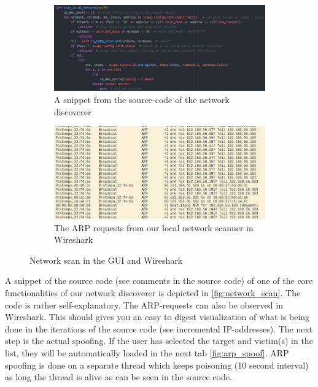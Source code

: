 \begin{figure}[t!]
	\centering
	\begin{subfigure}{0.51\textwidth}
	\includegraphics[width=\textwidth]{img/network_discoverer.png}
		\caption{A snippet from the source-code of the network discoverer}
	\end{subfigure}

	\begin{subfigure}{0.51\textwidth}
		\includegraphics[width=\textwidth]{img/wireshark_network_scan}
		\caption{The ARP requests from our local network scanner in Wireshark}
	\end{subfigure}
\caption{
	Network scan in the GUI and Wireshark}
	\label{fig:network_scan}
\end{figure}

A snippet of the source code (see comments in the source code) of one of the core functionalities of our network discoverer is depicted in \autoref{fig:network_scan}. The code is rather self-explanatory. The ARP-requests can also be observed in Wireshark. This should gives you an easy to digest visualization of what is being done in the iterations of the source code (see incremental IP-addresses). The next step is the actual spoofing. If the user has selected the target and victim(s) in the list, they will be automatically loaded in the next tab \autoref{fig:arp_spoof}. ARP spoofing is done on a separate thread which keeps poisoning (10 second interval) as long the thread is alive as can be seen in the source code.\\

